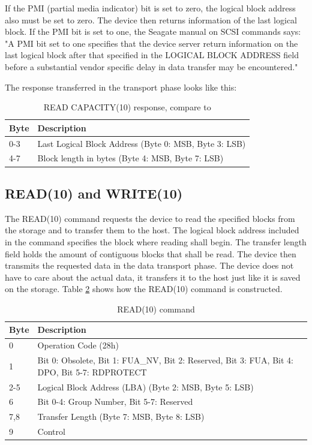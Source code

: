If the PMI (partial media indicator) bit is set to zero, the logical block address also must be set to zero. The device then returns information of the last logical block. If the PMI bit is set to one, the Seagate manual on SCSI commands says: "A PMI bit set to one specifies that the device server return information on the last logical block after that specified in the LOGICAL BLOCK ADDRESS field before a substantial vendor specific delay in data transfer may be encountered."\cite{scsi_seagate}

The response transferred in the transport phase looks like this:

\begin{table}[ht]
\caption{READ CAPACITY(10) response, compare to \cite{usb_ms_jan, scsi_seagate}}
\centering
\begin{tabular}{|l|l|}
\hline\hline
\textbf{Byte} & \textbf{Description}\\ \hline
0-3 & Last Logical Block Address (Byte 0: MSB, Byte 3: LSB)\\ \hline
4-7 & Block length in bytes (Byte 4: MSB, Byte 7: LSB) \\ \hline
\end{tabular}
\label{table:read_capacity_response}
\end{table}

\subsection{READ(10) and WRITE(10)}

The READ(10) command requests the device to read the specified blocks from the storage and to transfer them to the host. The logical block address included in the command specifies the block where reading shall begin. The transfer length field holds the amount of contiguous blocks that shall be read. The device then transmits the requested data in the data transport phase. The device does not have to care about the actual data, it transfers it to the host just like it is saved on the storage. Table \ref{table:read_10} shows how the READ(10) command is constructed.

\begin{table}[ht]
\caption{READ(10) command \cite{scsi_seagate}}
\centering
\begin{tabular}{|l|p{10cm}|}
\hline\hline
\textbf{Byte} & \textbf{Description}\\ \hline
0 & Operation Code (28h)\\ \hline
1 & Bit 0: Obsolete, Bit 1: FUA\_NV, Bit 2: Reserved, Bit 3: FUA, Bit 4: DPO, Bit 5-7: RDPROTECT \\ \hline
2-5 & Logical Block Address (LBA) (Byte 2: MSB, Byte 5: LSB) \\ \hline
6 & Bit 0-4: Group Number, Bit 5-7: Reserved \\ \hline
7,8 & Transfer Length (Byte 7: MSB, Byte 8: LSB) \\ \hline
9 & Control \\ \hline
\end{tabular}
\label{table:read_10}
\end{table}

